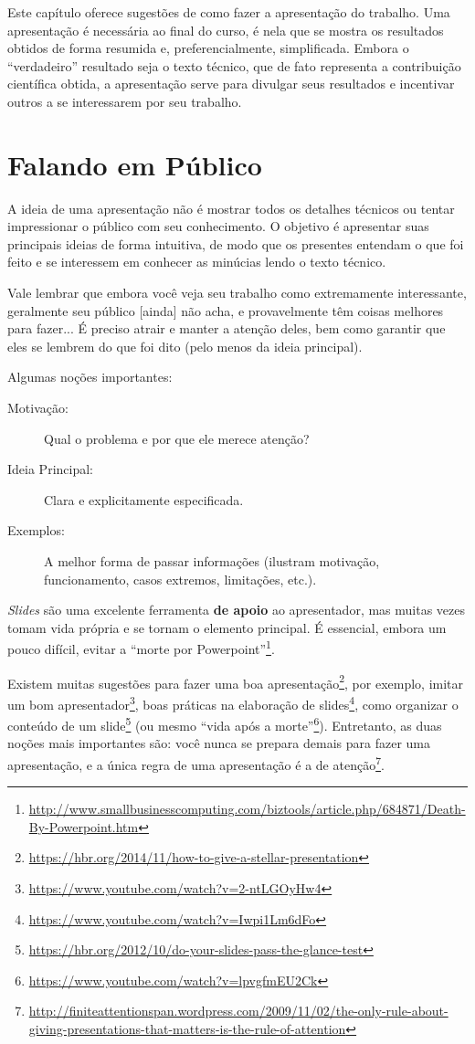 Este capítulo oferece sugestões de como fazer a apresentação do trabalho. Uma
apresentação é necessária ao final do curso, é nela que se mostra os resultados
obtidos de forma resumida e, preferencialmente, simplificada. Embora o ``verdadeiro''
resultado seja o texto técnico, que de fato representa a contribuição científica
obtida, a apresentação serve para divulgar seus resultados e incentivar outros a
se interessarem por seu trabalho.

\section{Falando em Público}
A ideia de uma apresentação não é mostrar todos os detalhes técnicos ou tentar
impressionar o público com seu conhecimento. O objetivo é apresentar suas principais
ideias de forma intuitiva, de modo que os presentes entendam o que foi feito e
se interessem em conhecer as minúcias lendo o texto técnico.

Vale lembrar que embora você veja seu trabalho como extremamente interessante,
geralmente seu público [ainda] não acha, e provavelmente têm coisas melhores para fazer...
É preciso atrair e manter a atenção deles, bem como garantir que eles se lembrem
do que foi dito (pelo menos da ideia principal).

Algumas noções importantes:
\begin{description}
  \item[Motivação:] Qual o problema e por que ele merece atenção?
  \item[Ideia Principal:] Clara e explicitamente especificada.
  \item[Exemplos:] A melhor forma de passar informações (ilustram motivação,
        funcionamento, casos extremos, limitações, etc.).
\end{description}

\emph{Slides} são uma excelente ferramenta \textbf{de apoio} ao apresentador, mas
muitas vezes tomam vida própria e se tornam o elemento principal. É essencial,
embora um pouco difícil,  evitar a ``morte por Powerpoint''\footnote{%
  \url{http://www.smallbusinesscomputing.com/biztools/article.php/684871/Death-By-Powerpoint.htm}}.

Existem muitas sugestões para fazer uma boa apresentação\footnote{\url{https://hbr.org/2014/11/how-to-give-a-stellar-presentation}},
por exemplo, imitar um bom apresentador\footnote{\url{https://www.youtube.com/watch?v=2-ntLGOyHw4}}, boas práticas na elaboração de slides\footnote{\url{https://www.youtube.com/watch?v=Iwpi1Lm6dFo}}, como organizar o conteúdo de um slide\footnote{\url{https://hbr.org/2012/10/do-your-slides-pass-the-glance-test}} (ou mesmo ``vida após a morte''\footnote{\url{https://www.youtube.com/watch?v=lpvgfmEU2Ck}}). Entretanto, as duas noções mais importantes são: você nunca se prepara demais para fazer uma apresentação, e a única regra de uma apresentação é a
de atenção\footnote{\url{http://finiteattentionspan.wordpress.com/2009/11/02/the-only-rule-about-giving-presentations-that-matters-is-the-rule-of-attention}}.

